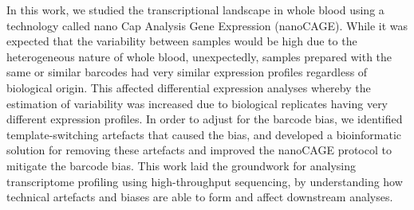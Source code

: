 In this work, we studied the transcriptional landscape in whole blood using a technology called nano Cap Analysis Gene Expression (nanoCAGE). While it was expected that the variability between samples would be high due to the heterogeneous nature of whole blood, unexpectedly, samples prepared with the same or similar barcodes had very similar expression profiles regardless of biological origin. This affected differential expression analyses whereby the estimation of variability was increased due to biological replicates having very different expression profiles. In order to adjust for the barcode bias, we identified template-switching artefacts that caused the bias, and developed a bioinformatic solution for removing these artefacts and improved the nanoCAGE protocol to mitigate the barcode bias. This work laid the groundwork for analysing transcriptome profiling using high-throughput sequencing, by understanding how technical artefacts and biases are able to form and affect downstream analyses.
